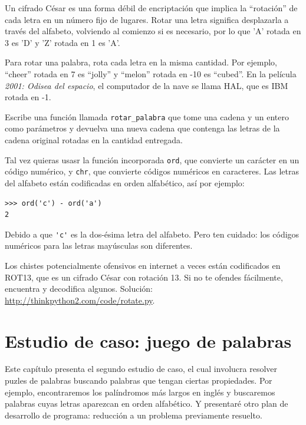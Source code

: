 \documentclass[10pt]{book}
\begin{document}
\begin{exercise}

\label{exrotate}
Un cifrado César es una forma débil de encriptación que implica la ``rotación'' de cada
letra en un número fijo de lugares.  Rotar una letra significa
desplazarla a través del alfabeto, volviendo al comienzo si
es necesario, por lo que 'A' rotada en 3 es 'D' y 'Z' rotada en 1 es 'A'.

Para rotar una palabra, rota cada letra en la misma cantidad.
Por ejemplo, ``cheer'' rotada en 7 es ``jolly'' y ``melon'' rotada
en -10 es ``cubed''.  En la película {\em 2001: Odisea del espacio}, el
computador de la nave se llama HAL, que es IBM rotada en -1.


Escribe una función llamada \verb"rotar_palabra"
que tome una cadena y un entero como parámetros y devuelva
una nueva cadena que contenga las letras de la cadena original
rotadas en la cantidad entregada.

Tal vez quieras usasr la función incorporada {\tt ord}, que convierte
un carácter en un código numérico, y {\tt chr}, que convierte códigos
numéricos en caracteres.  Las letras del alfabeto están codificadas en orden alfabético,
así por ejemplo:

\begin{verbatim}
>>> ord('c') - ord('a')
2
\end{verbatim}

Debido a que \verb"'c'" es la dos-ésima letra del alfabeto.  Pero ten
cuidado: los códigos numéricos para las letras mayúsculas son diferentes.

Los chistes potencialmente ofensivos en internet a veces están codificados en
ROT13, que es un cifrado César con rotación 13.  Si no te
ofendes fácilmente, encuentra y decodifica algunos.  Solución:
\url{http://thinkpython2.com/code/rotate.py}.

\end{exercise}


\chapter{Estudio de caso: juego de palabras}
\label{wordplay}

Este capítulo presenta el segundo estudio de caso, el cual involucra
resolver puzles de palabras buscando palabras que tengan ciertas
propiedades.  Por ejemplo, encontraremos los palíndromos más largos
en inglés y buscaremos palabras cuyas letras aparezcan en
orden alfabético.  Y presentaré otro plan de desarrollo de
programa: reducción a un problema previamente resuelto.
\end{document}
